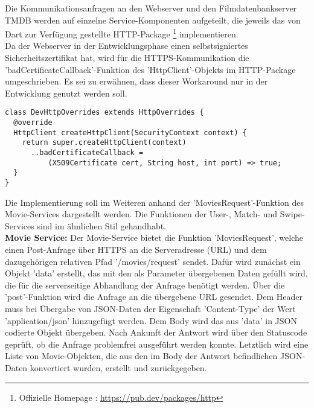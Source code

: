 Die Kommunikationsanfragen an den Webserver und den Filmdatenbankserver TMDB werden auf einzelne Service-Komponenten aufgeteilt, die jeweils das von Dart zur Verfügung gestellte HTTP-Package \footnote{Offizielle Homepage : \url{https://pub.dev/packages/http}} implementieren.\\
Da der Webserver in der Entwicklungsphase einen selbstsigniertes Sicherheitszertifikat hat, wird für die HTTPS-Kommunikation die 'badCertificateCallback'-Funktion des 'HttpClient'-Objekts im HTTP-Package umgeschrieben. Es sei zu erwähnen, dass dieser Workaround nur in der Entwicklung genutzt werden soll. 

\begin{lstlisting}[caption=Bad Certificate - Workaround, label=lst:badcertificateworkaround]
class DevHttpOverrides extends HttpOverrides {
  @override
  HttpClient createHttpClient(SecurityContext context) {
    return super.createHttpClient(context)
      ..badCertificateCallback =
          (X509Certificate cert, String host, int port) => true;
  }
}
\end{lstlisting}

\noindent
Die Implementierung soll im Weiteren anhand der 'MoviesRequest'-Funktion des Movie-Services dargestellt werden. Die Funktionen der User-, Match- und Swipe-Services sind im ähnlichen Stil gehandhabt. \\

\noindent
\textbf{Movie Service:}
Der Movie-Service bietet die Funktion 'MoviesRequest', welche einen Post-Anfrage über HTTPS an die Serveradresse (URL) und dem dazugehörigen relativen Pfad '/movies/request' sendet. Dafür wird zunächst ein Objekt 'data' erstellt, das mit den als Parameter übergebenen Daten gefüllt wird, die für die serverseitige Abhandlung der Anfrage benötigt werden. Über die 'post'-Funktion wird die Anfrage an die übergebene URL gesendet. Dem Header muss bei Übergabe von JSON-Daten der Eigenschaft 'Content-Type' der Wert 'application/json' hinzugefügt werden. Dem Body wird das aus 'data' in JSON codierte Objekt übergeben. Nach Ankunft der Antwort wird über den Statuscode geprüft, ob die Anfrage problemfrei ausgeführt werden konnte. Letztlich wird eine Liste von Movie-Objekten, die aus den im Body der Antwort befindlichen JSON-Daten konvertiert wurden, erstellt und zurückgegeben.

